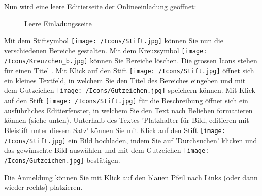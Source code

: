 \vspace{2cm}

Nun wird eine leere Editierseite der Onlineeinladung geöffnet:

\begin{figure}[H]
\caption{Leere Einladungsseite}
\end{figure}

Mit dem Stiftsymbol \texttt{[image: /Icons/Stift.jpg]} können Sie nun die verschiedenen Bereiche gestalten. Mit dem Kreuzsymbol \texttt{[image: /Icons/Kreuzchen\_b.jpg]} können Sie Bereiche löschen.
Die grossen Icons stehen für einen Titel . Mit Klick auf den Stift \texttt{[image: /Icons/Stift.jpg]} öffnet sich ein kleines Textfeld, in welchem Sie den Titel des Bereiches eingeben und mit dem Gutzeichen \texttt{[image: /Icons/Gutzeichen.jpg]} speichern können.
Mit Klick auf den Stift \texttt{[image: /Icons/Stift.jpg]} für die Beschreibung  öffnet sich ein ausführliches Editierfenster, in welchem Sie den Text nach Belieben formatieren können (siehe unten). Unterhalb des Textes 'Platzhalter für Bild, editieren mit Bleistift unter diesem Satz' können Sie mit Klick auf den Stift \texttt{[image: /Icons/Stift.jpg]} ein Bild hochladen, indem Sie auf 'Durchsuchen' klicken und das gewünschte Bild auswählen und mit dem Gutzeichen \texttt{[image: /Icons/Gutzeichen.jpg]} bestätigen. 

\vspace{\baselineskip}

Die Anmeldung  können Sie mit Klick auf den blauen Pfeil nach Links (oder dann wieder rechts) platzieren.

